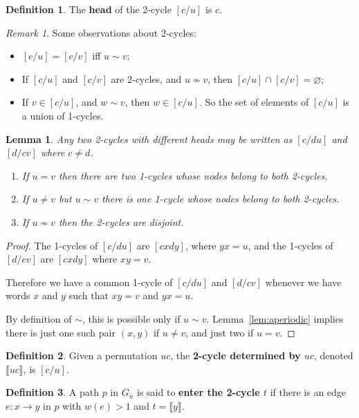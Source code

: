 \documentclass[a4paper]{article}
\newtheorem{lemma}{Lemma}
\theoremstyle{definition}
\newtheorem{defn}{Definition}[section]
\theoremstyle{remark}
\newtheorem*{remark}{Remark}
\let\definiendum\textbf
\begin{document}
\begin{defn}
    The \definiendum{head} of the 2-cycle $[c/u]$ is $c$.
\end{defn}
\begin{remark}
    Some observations about 2-cycles:
    \begin{itemize}
        \item $[c/u]=[c/v]$ iff $u\sim v$;
        \item If $[c/u]$ and $[c/v]$ are 2-cycles, and $u\not\sim v$, then $[c/u]\cap[c/v]=\varnothing$;
        \item If $v\in[c/u]$, and $w\sim v$, then $w\in[c/u]$. So the set of elements of $[c/u]$ is a union of 1-cycles.
    \end{itemize}
\end{remark}
\begin{lemma}\label{lem:2-cycle-intersection}
    Any two 2-cycles with different heads may be written as $[c/du]$ and $[d/cv]$ where $c\ne d$.
    \begin{enumerate}
        \item If $u=v$ then there are two 1-cycles whose nodes belong to both 2-cycles.
        \item If $u\ne v$ but $u\sim v$ there is one 1-cycle whose nodes belong to both 2-cycles.
        \item If $u\not\sim v$ then the 2-cycles are disjoint.
    \end{enumerate}
\end{lemma}
\begin{proof}
    The 1-cycles of $[c/du]$ are $[cxdy]$, where $yx=u$,
    and the 1-cycles of $[d/cv]$ are $[cxdy]$ where $xy=v$.

    Therefore we have a common 1-cycle of $[c/du]$ and $[d/cv]$
    whenever we have words $x$ and $y$ such that $xy=v$ and $yx=u$.

    By definition of $\sim$, this is possible only if $u\sim v$.
    Lemma~\ref{lem:aperiodic} implies there is just one such pair $(x,y)$ if $u\ne v$, and just two if $u=v$.
\end{proof}
\def\tcd#1{\llbracket#1\rrbracket}
\begin{defn}
    Given a permutation $uc$, the \definiendum{2-cycle determined by $uc$}, denoted $\tcd{uc}$, is $[c/u]$.
\end{defn}
\begin{defn}\label{def:enter}
    A path $p$ in $G_n$ is said to \definiendum{enter the 2-cycle $t$} if there is an edge $e: x\to y$ in $p$ with $w(e)>1$ and $t=\tcd y$.
\end{defn}
\end{document}
